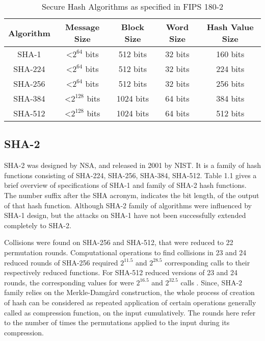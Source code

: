   \begin{table}[h]
    \begin{center}
    \begin{tabular}{ *{5}{c} }
      \hline
      Algorithm & Message Size & Block Size & Word Size & Hash Value Size \\ \hline \hline
      SHA-1   & \textless $2^{64}$  bits & 512  bits & 32 bits & 160 bits \\   
      SHA-224 & \textless $2^{64}$  bits & 512  bits & 32 bits & 224 bits \\   
      SHA-256 & \textless $2^{64}$  bits & 512  bits & 32 bits & 256 bits \\   
      SHA-384 & \textless $2^{128}$ bits & 1024 bits & 64 bits & 384 bits \\   
      SHA-512 & \textless $2^{128}$ bits & 1024 bits & 64 bits & 512 bits \\
      \hline
    \end{tabular}
    \caption{ Secure Hash Algorithms as specified in FIPS 180-2} 
  \end{center}
  \end{table}

  \subsection{SHA-2}

  SHA-2 was designed by NSA, and released in 2001 by NIST. It is a family of hash functions consisting of 
  SHA-224, SHA-256, SHA-384, SHA-512. Table 1.1 gives a brief overview of specifications
  of SHA-1 and family of SHA-2 hash functions. The number suffix after the SHA acronym, 
  indicates the bit length, of the output of that hash function. Although SHA-2 family of algorithms
  were influenced by SHA-1 design, but the attacks on SHA-1 have not been successfully extended completely
  to SHA-2.

  Collisions were found on SHA-256 and SHA-512, that were reduced to 22 permutation rounds. Computational
  operations to find collisions in 23 and 24 reduced rounds of SHA-256 required $2^{11.5}$ and $2^{28.5}$ 
  corresponding calls to their respectively reduced functions. For SHA-512 reduced versions of 23 and 24 rounds, 
  the corresponding values for were $2^{16.5}$ and $2^{32.5}$ calls \cite{00012}.
  Since, SHA-2 family relies on the Merkle-Damg\r{a}rd construction, the whole
  process of creation of hash can be considered as repeated application of certain operations generally called
  as compression function, on the input cumulatively. The rounds here refer to the number of times the permutations
  applied to the input during its compression.

